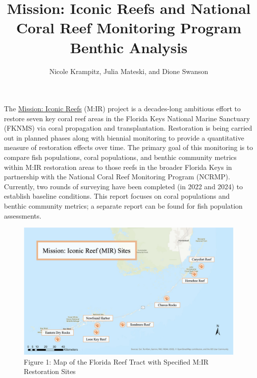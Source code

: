 \documentclass[
]{article}
\title{Mission: Iconic Reefs and National Coral Reef Monitoring Program
Benthic Analysis}
\author{Nicole Krampitz, Julia Mateski, and Dione Swanson}
\date{}
\begin{document}
\maketitle
\ifdefined\Shaded\renewenvironment{Shaded}{\begin{tcolorbox}[sharp corners, boxrule=0pt, interior hidden, borderline west={3pt}{0pt}{shadecolor}, enhanced, breakable, frame hidden]}{\end{tcolorbox}}\fi

The
\href{https://www.fisheries.noaa.gov/southeast/habitat-conservation/restoring-seven-iconic-reefs-mission-recover-coral-reefs-florida-keys}{Mission:
Iconic Reefs} (M:IR) project is a decades-long ambitious effort to
restore seven key coral reef areas in the Florida Keys National Marine
Sanctuary (FKNMS) via coral propagation and transplantation. Restoration
is being carried out in planned phases along with biennial monitoring to
provide a quantitative measure of restoration effects over time. The
primary goal of this monitoring is to compare fish populations, coral
populations, and benthic community metrics within M:IR restoration areas
to those reefs in the broader Florida Keys in partnership with the
National Coral Reef Monitoring Program (NCRMP). Currently, two rounds of
surveying have been completed (in 2022 and 2024) to establish baseline
conditions. This report focuses on coral populations and benthic
community metrics; a separate report can be found for fish population
assessments.

\begin{figure}

{\centering \includegraphics{images/MIR Map.png}

}

\caption{Figure 1: Map of the Florida Reef Tract with Specified M:IR
Restoration Sites}

\end{figure}
\end{document}
